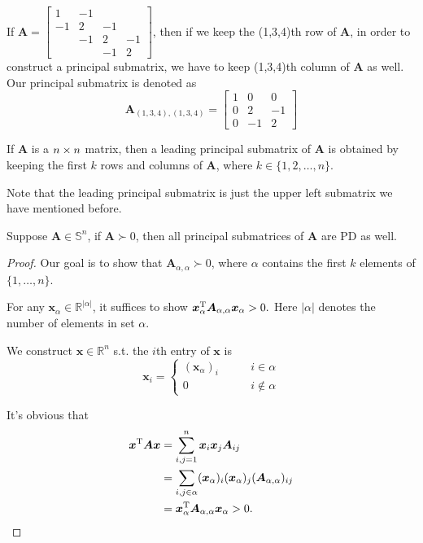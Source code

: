 \begin{example}
If $\bm A=\begin{bmatrix}
1&-1&&\\-1&2&-1&\\&-1&2&-1\\&&-1&2
\end{bmatrix}$, then if we keep the (1,3,4)th row of $\bm A$, in order to construct a principal submatrix, we have to keep (1,3,4)th column of $\bm A$ as well. Our principal submatrix is denoted as
\[
\bm A_{(1,3,4),(1,3,4)}=\begin{bmatrix}
1&0&0\\0&2&-1\\0&-1&2
\end{bmatrix}
\]
\end{example}
\begin{definition}
If $\bm A$ is a $n\times n$ matrix, then a leading principal submatrix of $\bm A$ is obtained by keeping the first $k$ rows and columns of $\bm A$, where $k\in\{1,2,\dots,n\}.$
\end{definition}
Note that the leading principal submatrix is just the upper left submatrix we have mentioned before.
\begin{corollary}
Suppose $\bm A\in\mathbb{S}^n$,
if $\bm A\succ0$, then all principal submatrices of $\bm A$ are PD as well.
\end{corollary}
\begin{proof}
Our goal is to show that $\bm A_{\alpha,\alpha}\succ0$, where $\alpha$ contains the first $k$ elements of $\{1,\dots,n\}$.

For any $\bm x_{\alpha}\in\mathbb{R}^{|\alpha|}$, it suffices to show $\bm x_{\alpha}^{\mathrm T}\bm A_{\alpha,\alpha}\bm x_{\alpha}>0.$ Here $|\alpha|$ denotes the number of elements in set $\alpha$.

We construct $\bm x\in\mathbb{R}^n$ s.t. the $i$th entry of $\bm x$ is
\[
\bm x_i=\left\{
\begin{aligned}
(\bm x_{\alpha})_i&\qquad i\in\alpha\\
0&\qquad i\notin\alpha
\end{aligned}\right.
\]

It's obvious that
\begin{align*}
\bm x^{\mathrm T}\bm A\bm x&=
\sum_{i,j=1}^{n}\bm x_i\bm x_j\bm A_{ij}\\
&=\sum_{i,j\in\alpha}(\bm x_{\alpha})_i(\bm x_{\alpha})_j(\bm A_{\alpha,\alpha})_{ij}\\
&=\bm x_{\alpha}^{\mathrm T}\bm A_{\alpha,\alpha}\bm x_{\alpha}>0.
\end{align*}
\end{proof}

